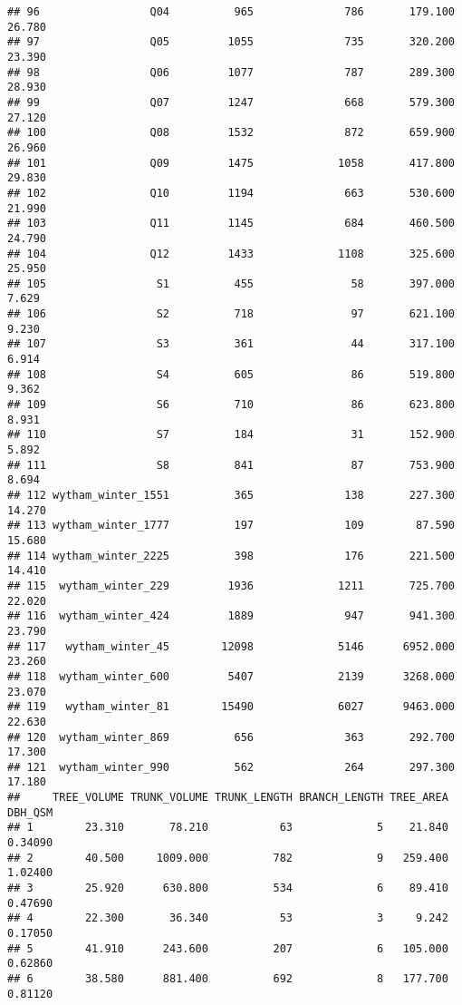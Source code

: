 \documentclass[]{article}
\begin{document}
\begin{verbatim}
## 96                 Q04          965              786       179.100      26.780
## 97                 Q05         1055              735       320.200      23.390
## 98                 Q06         1077              787       289.300      28.930
## 99                 Q07         1247              668       579.300      27.120
## 100                Q08         1532              872       659.900      26.960
## 101                Q09         1475             1058       417.800      29.830
## 102                Q10         1194              663       530.600      21.990
## 103                Q11         1145              684       460.500      24.790
## 104                Q12         1433             1108       325.600      25.950
## 105                 S1          455               58       397.000       7.629
## 106                 S2          718               97       621.100       9.230
## 107                 S3          361               44       317.100       6.914
## 108                 S4          605               86       519.800       9.362
## 109                 S6          710               86       623.800       8.931
## 110                 S7          184               31       152.900       5.892
## 111                 S8          841               87       753.900       8.694
## 112 wytham_winter_1551          365              138       227.300      14.270
## 113 wytham_winter_1777          197              109        87.590      15.680
## 114 wytham_winter_2225          398              176       221.500      14.410
## 115  wytham_winter_229         1936             1211       725.700      22.020
## 116  wytham_winter_424         1889              947       941.300      23.790
## 117   wytham_winter_45        12098             5146      6952.000      23.260
## 118  wytham_winter_600         5407             2139      3268.000      23.070
## 119   wytham_winter_81        15490             6027      9463.000      22.630
## 120  wytham_winter_869          656              363       292.700      17.300
## 121  wytham_winter_990          562              264       297.300      17.180
##     TREE_VOLUME TRUNK_VOLUME TRUNK_LENGTH BRANCH_LENGTH TREE_AREA DBH_QSM
## 1        23.310       78.210           63             5    21.840 0.34090
## 2        40.500     1009.000          782             9   259.400 1.02400
## 3        25.920      630.800          534             6    89.410 0.47690
## 4        22.300       36.340           53             3     9.242 0.17050
## 5        41.910      243.600          207             6   105.000 0.62860
## 6        38.580      881.400          692             8   177.700 0.81120

\end{verbatim}
\end{document}
